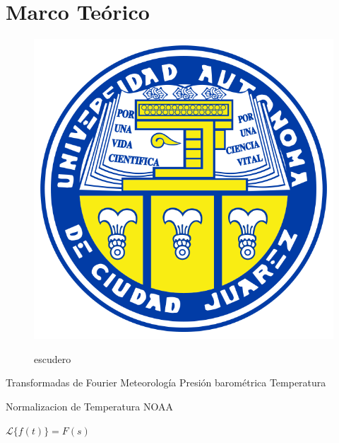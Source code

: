 \section{Marco Teórico}

\begin{figure}
   \centering
   \includegraphics[scale=0.5]{images/escudo-uacj.png}
   \label{fig:escudero}
   \caption[esc]{escudero}

\end{figure}

Transformadas de Fourier
Meteorología
   Presión barométrica
   Temperatura

Normalizacion de Temperatura
NOAA

$\mathscr{L}\{f(t)\}=F(s)$


